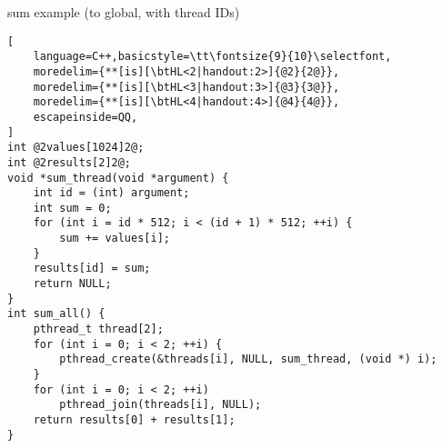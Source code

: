 
\begin{frame}[fragile,label=sumToGlobalWithId]{sum example (to global, with thread IDs)}
\begin{lstlisting}[
    language=C++,basicstyle=\tt\fontsize{9}{10}\selectfont,
    moredelim={**[is][\btHL<2|handout:2>]{@2}{2@}},
    moredelim={**[is][\btHL<3|handout:3>]{@3}{3@}},
    moredelim={**[is][\btHL<4|handout:4>]{@4}{4@}},
    escapeinside=QQ,
]
int @2values[1024]2@;
int @2results[2]2@;
void *sum_thread(void *argument) {
    int id = (int) argument;
    int sum = 0;
    for (int i = id * 512; i < (id + 1) * 512; ++i) {
        sum += values[i];
    }
    results[id] = sum;
    return NULL;
}
int sum_all() {
    pthread_t thread[2];
    for (int i = 0; i < 2; ++i) {
        pthread_create(&threads[i], NULL, sum_thread, (void *) i);
    }
    for (int i = 0; i < 2; ++i)
        pthread_join(threads[i], NULL);
    return results[0] + results[1];
}
\end{lstlisting}
\end{frame}
